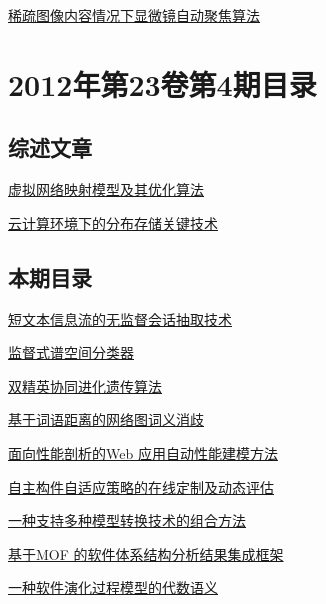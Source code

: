 \documentclass[a4paper]{article}
\begin{document}
\href{http://www.jos.org.cn/ch/reader/download_pdf.aspx?file_no=4099&year_id=2012&quarter_id=5&falg=1}{稀疏图像内容情况下显微镜自动聚焦算法}


\section{\textbf{2012年第23卷第4期目录}}
\subsection{综述文章}
\href{http://www.jos.org.cn/ch/reader/download_pdf.aspx?file_no=4063&year_id=2012&quarter_id=4&falg=1}{虚拟网络映射模型及其优化算法}

\href{http://www.jos.org.cn/ch/reader/download_pdf.aspx?file_no=4175&year_id=2012&quarter_id=4&falg=1}{云计算环境下的分布存储关键技术}

\subsection{本期目录}
\href{http://www.jos.org.cn/ch/reader/download_pdf.aspx?file_no=4031&year_id=2012&quarter_id=4&falg=1}{短文本信息流的无监督会话抽取技术}

\href{http://www.jos.org.cn/ch/reader/download_pdf.aspx?file_no=4039&year_id=2012&quarter_id=4&falg=1}{监督式谱空间分类器}

\href{http://www.jos.org.cn/ch/reader/download_pdf.aspx?file_no=4040&year_id=2012&quarter_id=4&falg=1}{双精英协同进化遗传算法}

\href{http://www.jos.org.cn/ch/reader/download_pdf.aspx?file_no=4116&year_id=2012&quarter_id=4&falg=1}{基于词语距离的网络图词义消歧}

\href{http://www.jos.org.cn/ch/reader/download_pdf.aspx?file_no=4027&year_id=2012&quarter_id=4&falg=1}{面向性能剖析的Web 应用自动性能建模方法}

\href{http://www.jos.org.cn/ch/reader/download_pdf.aspx?file_no=4029&year_id=2012&quarter_id=4&falg=1}{自主构件自适应策略的在线定制及动态评估}

\href{http://www.jos.org.cn/ch/reader/download_pdf.aspx?file_no=4041&year_id=2012&quarter_id=4&falg=1}{一种支持多种模型转换技术的组合方法}

\href{http://www.jos.org.cn/ch/reader/download_pdf.aspx?file_no=4043&year_id=2012&quarter_id=4&falg=1}{基于MOF 的软件体系结构分析结果集成框架}

\href{http://www.jos.org.cn/ch/reader/download_pdf.aspx?file_no=4160&year_id=2012&quarter_id=4&falg=1}{一种软件演化过程模型的代数语义}
\end{document}
